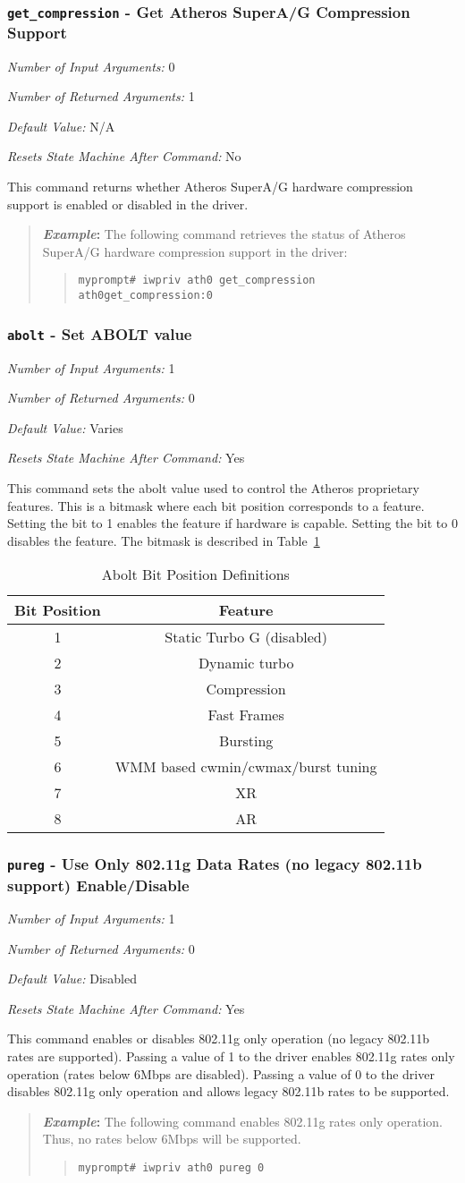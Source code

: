 \documentclass[10pt,fullpage]{article}
\newcommand{\mytt}[1]{{\texttt{#1}}}
\newcommand{\bv}{\begin{verse}}
\newcommand{\ev}{\end{verse}}
\newcommand{\cmd}[1]{{\texttt{myprompt\# #1}}}
\newcommand{\argdesc}[4]{\begin{description}
\itemsep -6pt
\item \textit{Number of Input Arguments:} #1
\item \textit{Number of Returned Arguments:} #2
\item \textit{Default Value:} #3
\item \textit{Resets State Machine After Command:} #4
\end{description}
}
\newenvironment{example}{\begin{quote}\textbf{\textit{Example}:}}{\end{quote}}
\begin{document}
\subsubsection{\mytt{get\_compression} - Get Atheros SuperA/G Compression Support}
\argdesc{0}{1}{N/A}{No}
This command returns whether Atheros SuperA/G hardware compression support is enabled or disabled
in the driver.
\begin{example}
The following command retrieves the status of Atheros SuperA/G
hardware compression support in the driver:
\bv
\cmd{iwpriv ath0 get\_compression}\\
\mytt{ath0\hspace{32pt}get\_compression:0}
\ev
\end{example}

\subsubsection{\mytt{abolt} - Set ABOLT value}
\argdesc{1}{0}{Varies}{Yes}
This command sets the abolt value used to control the Atheros
proprietary features.  This is a bitmask where each bit position
corresponds to a feature.  Setting the bit to 1 enables the feature if
hardware is capable.  Setting the bit to 0 disables the feature.  The
bitmask is described in Table~\ref{tab:abolt}
\begin{table}[h*]
  \centering
  \begin{tabular}{|c|c|} \hline
    Bit Position & Feature \\ \hline
    1 & Static Turbo G (disabled) \\
    2 & Dynamic turbo \\
    3 & Compression \\
    4 & Fast Frames \\
    5 & Bursting \\
    6 & WMM based cwmin/cwmax/burst tuning \\
    7 & XR \\
    8 & AR \\ \hline
  \end{tabular}
  \caption{Abolt Bit Position Definitions}
  \label{tab:abolt}
\end{table}

\subsubsection{\mytt{pureg} - Use Only 802.11g Data Rates (no legacy 802.11b
  support) Enable/Disable}
\argdesc{1}{0}{Disabled}{Yes}
This command enables or disables 802.11g only operation (no legacy
802.11b rates are supported).  Passing a value of 1 to the driver
enables 802.11g rates only operation (rates below 6Mbps are disabled).
Passing a value of 0 to the driver disables 802.11g only operation and
allows legacy 802.11b rates to be supported.
\begin{example}
The following command enables 802.11g rates only operation.  Thus, no
rates below 6Mbps will be supported.
\bv
\cmd{iwpriv ath0 pureg 0}
\ev
\end{example}
\end{document}
